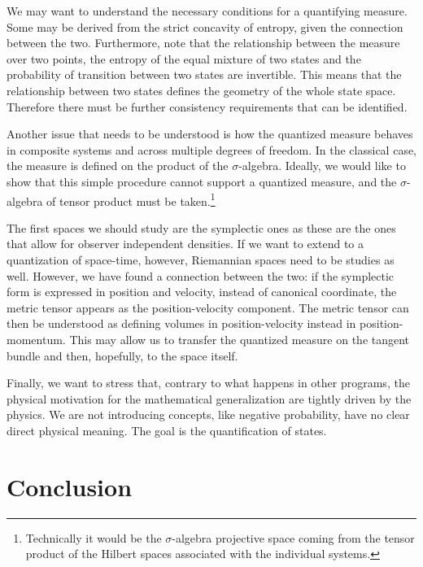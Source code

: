 \documentclass[10pt,twocolumn, nofootinbib]{revtex4-2}
\begin{document}
We may want to understand the necessary conditions for a quantifying measure. Some may be derived from the strict concavity of entropy, given the connection between the two. Furthermore, note that the relationship between the measure over two points, the entropy of the equal mixture of two states and the probability of transition between two states are invertible. This means that the relationship between two states defines the geometry of the whole state space. Therefore there must be further consistency requirements that can be identified.

Another issue that needs to be understood is how the quantized measure behaves in composite systems and across multiple degrees of freedom. In the classical case, the measure is defined on the product of the $\sigma$-algebra. Ideally, we would like to show that this simple procedure cannot support a quantized measure, and the $\sigma$-algebra of tensor product must be taken.\footnote{Technically it would be the $\sigma$-algebra projective space coming from the tensor product of the Hilbert spaces associated with the individual systems.}

The first spaces we should study are the symplectic ones as these are the ones that allow for observer independent densities. If we want to extend to a quantization of space-time, however, Riemannian spaces need to be studies as well. However, we have found a connection between the two: if the symplectic form is expressed in position and velocity, instead of canonical coordinate, the metric tensor appears as the position-velocity component. The metric tensor can then be understood as defining volumes in position-velocity instead in position-momentum. This may allow us to transfer the quantized measure on the tangent bundle and then, hopefully, to the space itself.

Finally, we want to stress that, contrary to what happens in other programs, the physical motivation for the mathematical generalization are tightly driven by the physics. We are not introducing concepts, like negative probability, have no clear direct physical meaning. The goal is the quantification of states.

\section{Conclusion}
\end{document}
